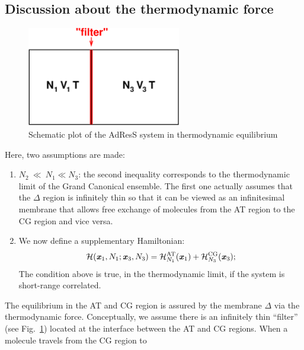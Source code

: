 \documentclass[aip,jcp,a4paper,reprint,onecolumn]{revtex4-1}
\newcommand{\vect}[1]{\textbf{\textit{#1}}}
\newcommand{\AT}{{\textrm{{AT}}}}
\newcommand{\CG}{{\textrm{CG}}}
\newcommand{\HY}{{\Delta}}
\begin{document}
\subsection{Discussion about the thermodynamic force}
\begin{figure}
  \centering
  \begin{minipage}[t]{0.49\linewidth}
  \includegraphics[width=0.6\textwidth]{fig.grand/partition.eps}    
  \end{minipage}
  \caption{Schematic plot of the AdResS system in thermodynamic equilibrium}
  \label{fig:tmp1}
\end{figure}
Here, two assumptions are made:
\begin{enumerate}\itemsep -1pt
\item $N_2\ {\ll}\ N_1 \ll N_3$: the second inequality corresponds to
  the thermodynamic limit of the Grand Canonical ensemble. The first
  one actually assumes that the $\HY$ region is infinitely thin so that it
  can be viewed as an infinitesimal membrane that allows free exchange of molecules from
  the AT region to the CG region and vice versa.
\item We now define a supplementary Hamiltonian:
  \begin{equation}
    \mathcal H(\vect x_1, N_1; \vect x_3, N_3) =
    \mathcal H_{N_1}^{\AT}(\vect x_1) + \mathcal H_{N_3}^{\CG}(\vect x_3); 
  \end{equation}
  The condition above is true, in the thermodynamic limit, if the system is
  short-range correlated.
\end{enumerate}
The equilibrium in the AT and CG region is assured by the membrane $\HY$ via the thermodynamic force. Conceptually, we assume there is an infinitely thin
``filter'' (see Fig.~\ref{fig:tmp1}) located at the interface between
the AT and CG regions. When a molecule travels from the CG region to
\end{document}

